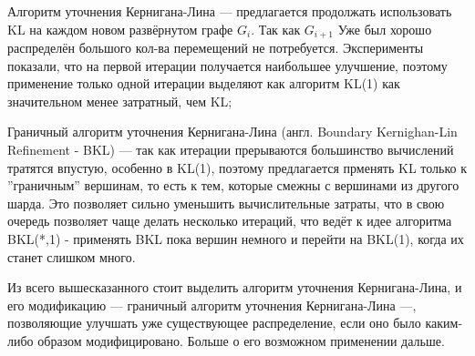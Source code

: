 Алгоритм уточнения Кернигана-Лина  --- предлагается продолжать использовать KL на каждом новом развёрнутом графе $G_i$. Так как $G_{i+1}$ Уже был хорошо распределён большого кол-ва перемещений не потребуется. Эксперименты показали, что на первой итерации получается наибольшее улучшение, поэтому применение только одной итерации выделяют как алгоритм KL(1) как значительном менее затратный, чем KL;

Граничный алгоритм уточнения Кернигана-Лина (англ. Boundary Kernighan-Lin Refinement - BKL) --- так как итерации прерываются большинство вычислений тратятся впустую, особенно в KL(1), поэтому предлагается прменять KL только к ''граничным'' вершинам, то есть к тем, которые смежны с вершинами из другого шарда. Это позволяет сильно уменьшить вычислительные затраты, что в свою очередь позволяет чаще делать несколько итераций, что ведёт к идее алгоритма BKL(*,1) - применять BKL пока вершин немного и перейти на BKL(1), когда их станет слишком много.

Из всего вышесказанного стоит выделить алгоритм уточнения Кернигана-Лина, и его модификацию --- граничный алгоритм уточнения Кернигана-Лина ---, позволяющие улучшать уже существующее распределение, если оно было каким-либо образом модифицировано. Больше о его возможном применении дальше.
